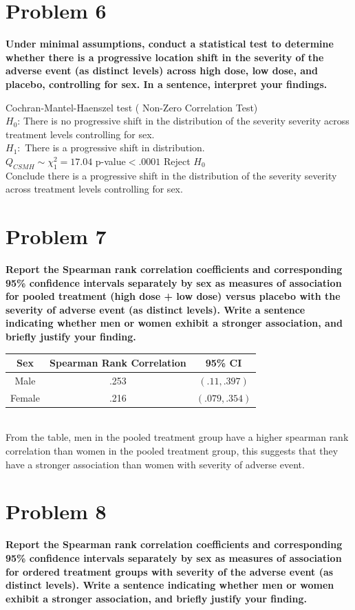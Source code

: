 \documentclass{article}
\begin{document}
\begin{flushleft}
\section*{Problem 6}
\textbf{Under minimal assumptions, conduct a statistical test to determine whether there is a progressive
location shift in the severity of the adverse event (as distinct levels) across high dose, low dose, and
placebo, controlling for sex. In a sentence, interpret your findings.}\medbreak

 Cochran-Mantel-Haenszel test ( Non-Zero Correlation Test)\\
$H_0$: There is no progressive shift in the distribution of the severity severity across
treatment levels controlling for sex.\\
$H_1:$ There is a progressive shift in distribution.\\
$Q_{CSMH}\sim \chi^2_1=17.04$ p-value$<.0001$ Reject $H_0$ \\
Conclude there is a progressive shift in the distribution of the severity severity across
treatment levels controlling for sex.\\
\pagebreak
\section*{Problem 7}
\textbf{Report the Spearman rank correlation coefficients and corresponding 95\% confidence intervals
separately by sex as measures of association for pooled treatment (high dose + low dose) versus
placebo with the severity of adverse event (as distinct levels). Write a sentence indicating whether
men or women exhibit a stronger association, and briefly justify your finding.}\medbreak
\begin{tabular}{|c|c|c|}
	\hline
	Sex & Spearman Rank Correlation & 95\% CI\\
	\hline
	Male&.253 & $(.11,.397)$\\ 
	\hline
	Female&.216 & $(.079,.354)$\\ 
	\hline
\end{tabular}\\
From the table, men in the pooled treatment group have a higher spearman rank correlation than women in the pooled treatment group, this suggests that they have a stronger association than women with severity of adverse event.
\pagebreak
\section*{Problem 8}
\textbf{Report the Spearman rank correlation coefficients and corresponding 95\% confidence intervals
separately by sex as measures of association for ordered treatment groups with severity of the adverse
event (as distinct levels). Write a sentence indicating whether men or women exhibit a stronger
association, and briefly justify your finding.}\medbreak


\end{flushleft}
\end{document}
